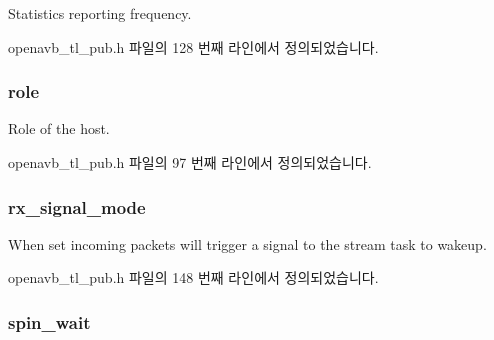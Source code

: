 Statistics reporting frequency. 



openavb\+\_\+tl\+\_\+pub.\+h 파일의 128 번째 라인에서 정의되었습니다.

\subsubsection[{\texorpdfstring{role}{role}}]{ role}\hypertarget{structopenavb__tl__cfg__t_a172ec388c6d270261a61a789b78dff45}{}\label{structopenavb__tl__cfg__t_a172ec388c6d270261a61a789b78dff45}


Role of the host. 



openavb\+\_\+tl\+\_\+pub.\+h 파일의 97 번째 라인에서 정의되었습니다.

\subsubsection[{\texorpdfstring{rx\+\_\+signal\+\_\+mode}{rx_signal_mode}}]{ rx\+\_\+signal\+\_\+mode}\hypertarget{structopenavb__tl__cfg__t_a580a82350a4c45004177344444bd25c5}{}\label{structopenavb__tl__cfg__t_a580a82350a4c45004177344444bd25c5}


When set incoming packets will trigger a signal to the stream task to wakeup. 



openavb\+\_\+tl\+\_\+pub.\+h 파일의 148 번째 라인에서 정의되었습니다.

\subsubsection[{\texorpdfstring{spin\+\_\+wait}{spin_wait}}]{ spin\+\_\+wait}\hypertarget{structopenavb__tl__cfg__t_a5e39677fff9263d5891c77729b718142}{}\label{structopenavb__tl__cfg__t_a5e39677fff9263d5891c77729b718142}


